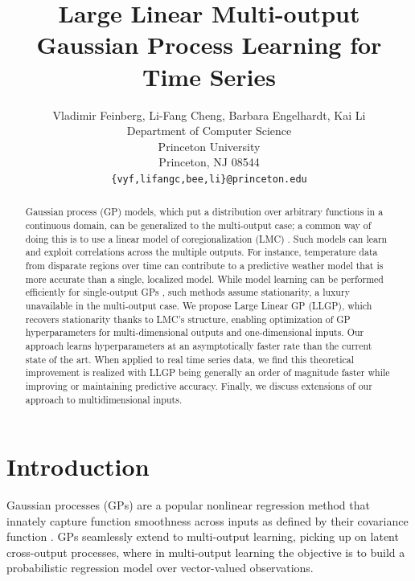 \documentclass{article}
\title{Large Linear Multi-output Gaussian Process Learning for Time Series}
\author{
  Vladimir Feinberg, Li-Fang Cheng, {Barbara Engelhardt}, {Kai Li}\\
  Department of Computer Science\\
  Princeton University\\
  Princeton, NJ 08544 \\
  \texttt{\{vyf,lifangc,bee,li\}@princeton.edu} \\
}
\begin{document}
\maketitle

\begin{abstract}
Gaussian process (GP) models, which put a distribution over arbitrary functions in a continuous domain, can be generalized to the multi-output case; a common way of doing this is to use a linear model of coregionalization (LMC) \cite{alvarez2012kernels}. Such models can learn and exploit correlations across the multiple outputs. For instance, temperature data from disparate regions over time can contribute to a predictive weather model that is more accurate than a single, localized model. While model learning can be performed efficiently for single-output GPs \cite{msgp}, such methods assume stationarity, a luxury unavailable in the multi-output case. We propose Large Linear GP (LLGP), which recovers stationarity thanks to LMC's structure, enabling optimization of GP hyperparameters for multi-dimensional outputs and one-dimensional inputs. Our approach learns hyperparameters at an asymptotically faster rate than the current state of the art. When applied to real time series data, we find this theoretical improvement is realized with LLGP being generally an order of magnitude faster while improving or maintaining predictive accuracy. Finally, we discuss extensions of our approach to multidimensional inputs.
\end{abstract}


\section{Introduction}\label{introduction}

Gaussian processes (GPs) are a popular nonlinear regression method that innately capture function smoothness across inputs as defined by their covariance function \cite{williams1996gaussian}. GPs seamlessly extend to multi-output learning, picking up on latent cross-output processes, where in multi-output learning the objective is to build a probabilistic regression model over vector-valued observations.
\end{document}
